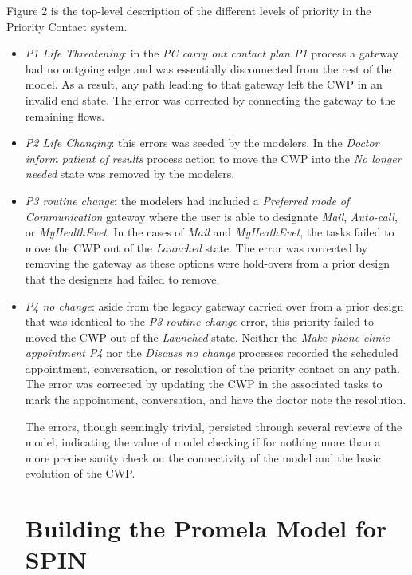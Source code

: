 Figure 2 is the top-level description of the different levels of priority in the Priority Contact system. 
\begin{itemize}
\item \emph{P1 Life Threatening}: in the \emph{PC carry out contact plan P1} process a gateway had no outgoing edge and was essentially disconnected from the rest of the model. As a result, any path leading to that gateway left the CWP in an invalid end state. The error was corrected by connecting the gateway to the remaining flows.

\item \emph{P2 Life Changing}: this errors was seeded by the modelers. In the \emph{Doctor inform patient of results} process action to move the CWP into the \emph{No longer needed} state was removed by the modelers.

\item \emph{P3 routine change}: the modelers had included a \emph{Preferred mode of Communication} gateway where the user is able to designate \emph{Mail}, \emph{Auto-call}, or \emph{MyHealthEvet}. In the cases of \emph{Mail} and \emph{MyHeathEvet}, the tasks failed to move the CWP out of the \emph{Launched} state. The error was corrected by removing the gateway as these options were hold-overs from a prior design that the designers had failed to remove.

\item \emph{P4 no change}: aside from the legacy gateway carried over from a prior design that was identical to the \emph{P3 routine change} error, this priority failed to moved the CWP out of the \emph{Launched} state. Neither the \emph{Make phone clinic appointment P4} nor the \emph{Discuss no change} processes recorded the scheduled appointment, conversation, or resolution of the priority contact on any path. The error was corrected by updating the CWP in the associated tasks to mark the appointment, conversation, and have the doctor note the resolution.

The errors, though seemingly trivial, persisted through several reviews of the model, indicating the value of model checking if for nothing more than a more precise sanity check on the connectivity of the model and the basic evolution of the CWP.


\section{Building the Promela Model for SPIN}


\end{itemize}
